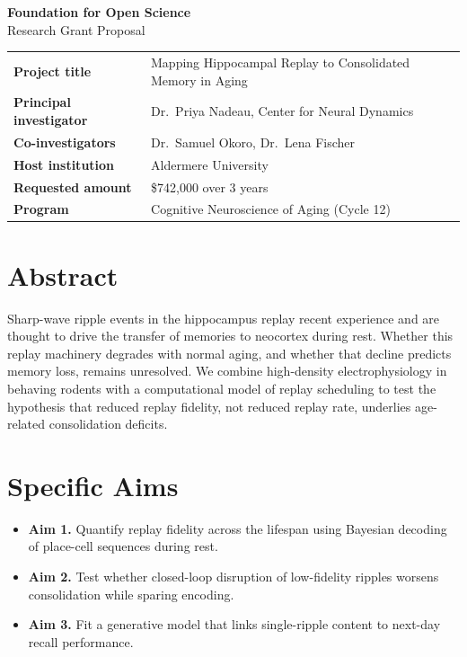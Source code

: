 \documentclass[11pt]{article}
\begin{document}
\begin{center}
  {\LARGE\bfseries\color{accent} Foundation for Open Science}\\[0.2em]
  {\large Research Grant Proposal}
\end{center}

\vspace{0.6em}
\begin{tabularx}{\textwidth}{@{}lX@{}}
\toprule
\textbf{Project title} & Mapping Hippocampal Replay to Consolidated Memory in Aging \\
\textbf{Principal investigator} & Dr.\ Priya Nadeau, Center for Neural Dynamics \\
\textbf{Co-investigators} & Dr.\ Samuel Okoro, Dr.\ Lena Fischer \\
\textbf{Host institution} & Aldermere University \\
\textbf{Requested amount} & \$742,000 over 3 years \\
\textbf{Program} & Cognitive Neuroscience of Aging (Cycle 12) \\
\bottomrule
\end{tabularx}

\section{Abstract}
Sharp-wave ripple events in the hippocampus replay recent experience and are
thought to drive the transfer of memories to neocortex during rest. Whether
this replay machinery degrades with normal aging, and whether that decline
predicts memory loss, remains unresolved. We combine high-density
electrophysiology in behaving rodents with a computational model of replay
scheduling to test the hypothesis that reduced replay fidelity, not reduced
replay rate, underlies age-related consolidation deficits.

\section{Specific Aims}
\begin{itemize}[leftmargin=1.4em, itemsep=0.15em]
  \item \textbf{Aim 1.} Quantify replay fidelity across the lifespan using
        Bayesian decoding of place-cell sequences during rest.
  \item \textbf{Aim 2.} Test whether closed-loop disruption of low-fidelity
        ripples worsens consolidation while sparing encoding.
  \item \textbf{Aim 3.} Fit a generative model that links single-ripple content
        to next-day recall performance.
\end{itemize}
\end{document}
